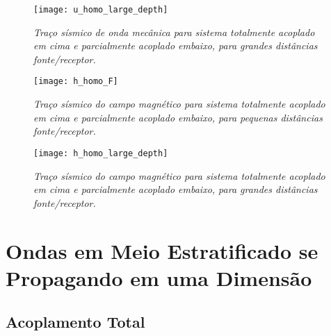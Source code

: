 \begin{landscape}
\begin{figure}
\centering
\texttt{[image: u\_homo\_large\_depth]}
\caption{\textit{Tra\c{c}o s\'ismico de onda mec\^anica para sistema totalmente acoplado em cima e parcialmente acoplado embaixo, para grandes dist\^ancias fonte/receptor.}}
\end{figure}
\label{fig.mag_homo_low_dep}
\end{landscape}

\begin{landscape}
\begin{figure}
\centering
\texttt{[image: h\_homo\_F]}
\caption{\textit{Tra\c{c}o s\'ismico do campo magn\'etico para sistema totalmente acoplado em cima e parcialmente acoplado embaixo, para pequenas dist\^ancias fonte/receptor.}}
\label{fig.mech_homo_high_dep}
\end{figure}
\end{landscape}

\begin{landscape}
\begin{figure}
\centering
\texttt{[image: h\_homo\_large\_depth]}
\caption{\textit{Tra\c{c}o s\'ismico do campo magn\'etico para sistema totalmente acoplado em cima e parcialmente acoplado embaixo, para grandes dist\^ancias fonte/receptor.}}
\label{fig.mag_homo_high_dep}
\end{figure}
\end{landscape}

\section{Ondas em Meio Estratificado se Propagando em uma Dimens\~ao}\label{sec.prop_strat_1D}

\subsection{Acoplamento Total}\label{sec.1D_four_fully}


